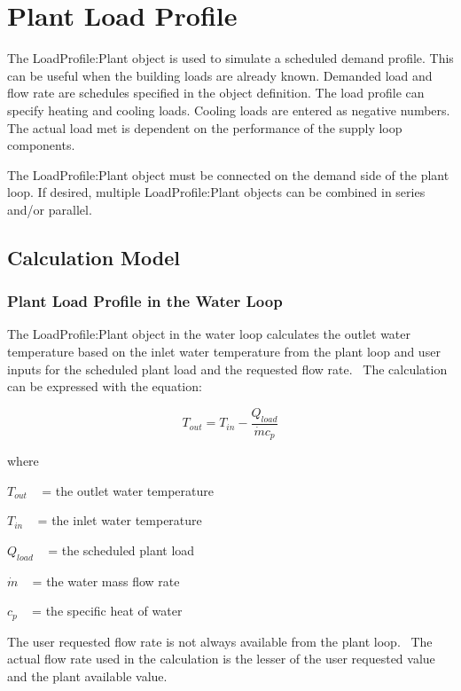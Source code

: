 \section{Plant Load Profile}\label{plant-load-profile}

The LoadProfile:Plant object is used to simulate a scheduled demand profile. This can be useful when the building loads are already known. Demanded load and flow rate are schedules specified in the object definition. The load profile can specify heating and cooling loads. Cooling loads are entered as negative numbers. The actual load met is dependent on the performance of the supply loop components.

The LoadProfile:Plant object must be connected on the demand side of the plant loop. If desired, multiple LoadProfile:Plant objects can be combined in series and/or parallel.

\subsection{Calculation Model}\label{calculation-model}

\subsubsection{Plant Load Profile in the Water Loop}\label{plant-load-profile-in-the-water-loop}

The LoadProfile:Plant object in the water loop calculates the outlet water temperature based on the inlet water temperature from the plant loop and user inputs for the scheduled plant load and the requested flow rate.~ The calculation can be expressed with the equation:

\begin{equation}
{T_{out}} = {T_{in}} - \frac{{{Q_{load}}}}{{\dot m{c_p}}}
\end{equation}

where

\({T_{out}}\) ~ = the outlet water temperature

\({T_{in}}\) ~ = the inlet water temperature

\({Q_{load}}\) ~ = the scheduled plant load

\(\dot m\) ~ = the water mass flow rate

\({c_p}\) ~ = the specific heat of water

The user requested flow rate is not always available from the plant loop.~ The actual flow rate used in the calculation is the lesser of the user requested value and the plant available value.

